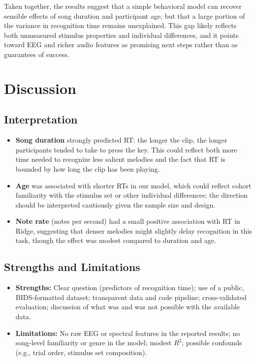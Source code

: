 \documentclass[11pt,a4paper]{article}
\begin{document}
Taken together, the results suggest that a simple behavioral model can recover sensible effects of song duration and participant age, but that a large portion of the variance in recognition time remains unexplained. This gap likely reflects both unmeasured stimulus properties and individual differences, and it points toward EEG and richer audio features as promising next steps rather than as guarantees of success.

\section{Discussion}

\subsection{Interpretation}

\begin{itemize}[leftmargin=*]
    \item \textbf{Song duration} strongly predicted RT: the longer the clip, the longer participants tended to take to press the key. This could reflect both more time needed to recognize less salient melodies and the fact that RT is bounded by how long the clip has been playing.
    \item \textbf{Age} was associated with shorter RTs in our model, which could reflect cohort familiarity with the stimulus set or other individual differences; the direction should be interpreted cautiously given the sample size and design.
    \item \textbf{Note rate} (notes per second) had a small positive association with RT in Ridge, suggesting that denser melodies might slightly delay recognition in this task, though the effect was modest compared to duration and age.
\end{itemize}

\subsection{Strengths and Limitations}

\begin{itemize}[leftmargin=*]
    \item \textbf{Strengths:} Clear question (predictors of recognition time); use of a public, BIDS-formatted dataset; transparent data and code pipeline; cross-validated evaluation; discussion of what was and was not possible with the available data.
    \item \textbf{Limitations:} No raw EEG or spectral features in the reported results; no song-level familiarity or genre in the model; modest $R^2$; possible confounds (e.g., trial order, stimulus set composition).
\end{itemize}
\end{document}

